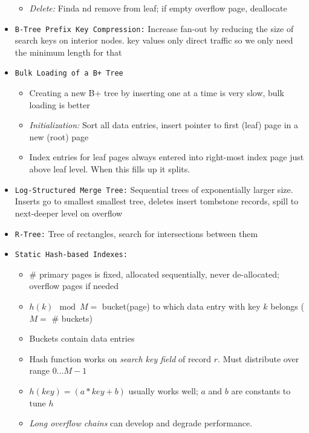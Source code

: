\documentclass[landscape,8pt]{extarticle}
\newcommand{\code}{\lstinline}
\begin{document}
\begin{multicols}{5}
\begin{itemize}
\begin{itemize}
                  \item \emph{Delete:} Finda nd remove from leaf; if empty overflow page, deallocate
              \end{itemize}
        \item \code{B-Tree Prefix Key Compression:} Increase fan-out by reducing the size of search keys on interior nodes. key values only direct traffic so we only need the minimum length for that
        \item \code{Bulk Loading of a B+ Tree}
              \begin{itemize}
                  \item Creating a new B+ tree by inserting one at a time is very slow, bulk loading is better
                  \item \emph{Initialization:} Sort all data entries, insert pointer to first (leaf) page in a new (root) page
                  \item Index entries for leaf pages always entered into right-most index page just above leaf level. When this fills up it splits.
              \end{itemize}
        \item \code{Log-Structured Merge Tree:} Sequential trees of exponentially larger size. Inserts go to smallest smallest tree, deletes insert tombstone records, spill to next-deeper level on overflow
        \item \code{R-Tree:} Tree of rectangles, search for intersections between them
        \item \code{Static Hash-based Indexes:}
              \begin{itemize}
                  \item \# primary pages is fixed, allocated sequentially, never de-allocated; overflow pages if needed
                  \item $h(k) \mod M = $ bucket(page) to which data entry with key $k$ belongs ($M = $ \# buckets)
                  \item Buckets contain data entries
                  \item Hash function works on \emph{search key field} of record $r$. Must distribute over range $0 \dots M-1$
                  \item $h(key) = (a * key + b)$ usually works well; $a$ and $b$ are constants to tune $h$
                  \item \emph{Long overflow chains} can develop and degrade performance.
              \end{itemize}

\end{itemize}
\end{multicols}
\end{document}
